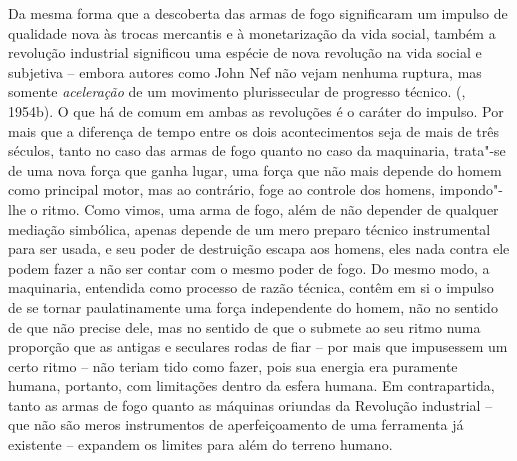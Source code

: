 Da mesma forma que a descoberta das armas de fogo significaram um
impulso de qualidade nova às trocas mercantis e à monetarização da vida
social, também a revolução industrial significou uma espécie de nova
revolução na vida social e subjetiva -- embora autores como John Nef não
vejam nenhuma ruptura, mas somente \emph{aceleração} de um movimento
plurissecular de progresso técnico. (, 1954b). O que há de comum em
ambas as revoluções é o caráter do impulso. Por mais que a diferença de
tempo entre os dois acontecimentos seja de mais de três séculos, tanto
no caso das armas de fogo quanto no caso da maquinaria, trata"-se de uma
nova força que ganha lugar, uma força que não mais depende do homem como
principal motor, mas ao contrário, foge ao controle dos homens,
impondo"-lhe o ritmo. Como vimos, uma arma de fogo, além de não depender
de qualquer mediação simbólica, apenas depende de um mero preparo
técnico instrumental para ser usada, e seu poder de destruição escapa
aos homens, eles nada contra ele podem fazer a não ser contar com o
mesmo poder de fogo. Do mesmo modo, a maquinaria, entendida como
processo de razão técnica, contêm em si o impulso de se tornar
paulatinamente uma força independente do homem, não no sentido de que
não precise dele, mas no sentido de que o submete ao seu ritmo numa
proporção que as antigas e seculares rodas de fiar -- por mais que
impusessem um certo ritmo -- não teriam tido como fazer, pois sua
energia era puramente humana, portanto, com limitações dentro da esfera
humana. Em contrapartida, tanto as armas de fogo quanto as máquinas
oriundas da Revolução industrial -- que não são meros instrumentos de
aperfeiçoamento de uma ferramenta já existente -- expandem os limites
para além do terreno humano.

